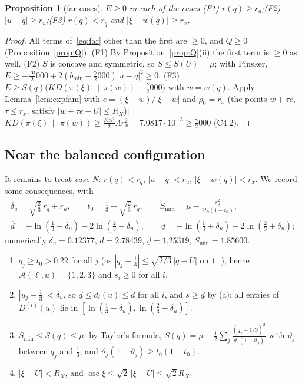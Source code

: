 \documentclass[11pt]{article}
\newtheorem{proposition}[lemma]{Proposition}
\theoremstyle{definition}
\numberwithin{equation}{section}
\newcommand{\one}{\mathbf 1}
\newcommand{\KL}[2]{D(#1\,\|\,#2)}
\newcommand{\Azero}{2000}
\newcommand{\cA}{\mathcal A}
\newcommand{\osc}{\operatorname{osc}}
\newcommand{\dlo}{\underline d}
\newcommand{\dhi}{\overline d}
\newcommand{\Smin}{S_{\min}}
\newcommand{\bmin}{b_{\min}}
\begin{document}
\begin{proposition}[far cases]\label{prop:far}
$E\ge0$ in each of the cases
\textup{(F1)} $r(q)\ge r_q$;\quad \textup{(F2)} $|u-q|\ge r_u$;\quad \textup{(F3)} $r(q)<r_q$ and $|\xi-w(q)|\ge r_x$.
\end{proposition}
\begin{proof}
All terms of~\eqref{eq:far} other than the first are $\ge0$, and $Q\ge0$ (Proposition~\ref{prop:Q}).
(F1) By Proposition~\ref{prop:Q}(ii) the first term is $\ge0$ as well.
(F2) $S$ is concave and symmetric, so $S\le S(U)=\mu$; with Pinsker, $E\ge-\frac{\gamma\mu}\Azero+2(\bmin-\frac\gamma\Azero)|u-q|^2\ge0$.
(F3) $E\ge S(q)\bigl(K\KL{\pi(\xi)}{\pi(w)}-\frac\gamma\Azero\bigr)$ with $w=w(q)$. Apply Lemma~\ref{lem:expfam} with $e=(\xi-w)/|\xi-w|$ and
$\rho_0=r_x$ (the points $w+\tau e$, $\tau\le r_x$, satisfy $|w+\tau e-U|\le R_X$): $K\KL{\pi(\xi)}{\pi(w)}\ge\frac{K\alpha^2}2\Lambda r_x^2
=7.0817\cdot10^{-5}\ge\frac\gamma\Azero$ (C4.2).
\end{proof}

\subsection{Near the balanced configuration}

It remains to treat \emph{case N}: $r(q)<r_q$, $|u-q|<r_u$, $|\xi-w(q)|<r_x$. We record some consequences, with
\begin{gather*}
\delta_u=\sqrt{\tfrac23}\,r_q+r_u,\qquad t_0=\tfrac13-\sqrt{\tfrac23}\,r_q,\qquad \Smin=\mu-\frac{r_q^2}{2t_0(1-t_0)},\\
\dhi=-\ln(\tfrac13-\delta_u)-2\ln(\tfrac23-\delta_u),\qquad \dlo=-\ln(\tfrac13+\delta_u)-2\ln(\tfrac23+\delta_u);
\end{gather*}
numerically $\delta_u=0.12377$, $\dhi=2.78439$, $\dlo=1.25319$, $\Smin=1.85600$.
\begin{enumerate}[label=(\alph*)]
\item $q_j\ge t_0>0.22$ for all $j$ (as $|q_j-\frac13|\le\sqrt{2/3}\,|q-U|$ on $\one^\perp$); hence $\cA(\ell,u)=\{1,2,3\}$ and $s_i\ge0$
for all $i$.
\item $|u_j-\frac13|<\delta_u$, so $\dlo\le d_i(u)\le\dhi$ for all $i$, and $s\ge\dlo$ by (a); all entries of $D^{(i)}(u)$ lie in
$[\ln(\frac13-\delta_u),\ln(\frac23+\delta_u)]$.
\item $\Smin\le S(q)\le\mu$: by Taylor's formula, $S(q)=\mu-\frac12\sum_j\frac{(q_j-1/3)^2}{\vartheta_j(1-\vartheta_j)}$ with $\vartheta_j$
between $q_j$ and $\frac13$, and $\vartheta_j(1-\vartheta_j)\ge t_0(1-t_0)$.
\item $|\xi-U|<R_X$, and $\osc\xi\le\sqrt2\,|\xi-U|\le\sqrt2R_X$.
\end{enumerate}
\end{document}
